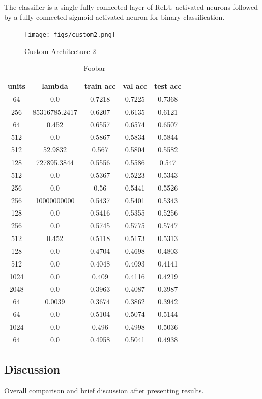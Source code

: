 The classifier is a single fully-connected layer of ReLU-activated neurons followed by a fully-connected sigmoid-activated neuron for binary classification.

\begin{figure}[ht]
    \centering
    \texttt{[image: figs/custom2.png]}
    \caption{Custom Architecture 2}
    \label{fig:custom2}
\end{figure}


\begin{table}[ht]
\centering \begin{tabular}{ |c|c|c|c|c| }
\hline
units & lambda & train acc & val acc & test acc \\
\hline
64 & 0.0 & 0.7218 & 0.7225 & 0.7368 \\
256 & 85316785.2417 & 0.6207 & 0.6135 & 0.6121 \\
64 & 0.452 & 0.6557 & 0.6574 & 0.6507 \\
512 & 0.0 & 0.5867 & 0.5834 & 0.5844 \\
512 & 52.9832 & 0.567 & 0.5804 & 0.5582 \\
128 & 727895.3844 & 0.5556 & 0.5586 & 0.547 \\
512 & 0.0 & 0.5367 & 0.5223 & 0.5343 \\
256 & 0.0 & 0.56 & 0.5441 & 0.5526 \\
256 & 10000000000 & 0.5437 & 0.5401 & 0.5343 \\
128 & 0.0 & 0.5416 & 0.5355 & 0.5256 \\
256 & 0.0 & 0.5745 & 0.5775 & 0.5747 \\
512 & 0.452 & 0.5118 & 0.5173 & 0.5313 \\
128 & 0.0 & 0.4704 & 0.4698 & 0.4803 \\
512 & 0.0 & 0.4048 & 0.4093 & 0.4141 \\
1024 & 0.0 & 0.409 & 0.4116 & 0.4219 \\
2048 & 0.0 & 0.3963 & 0.4087 & 0.3987 \\
64 & 0.0039 & 0.3674 & 0.3862 & 0.3942 \\
64 & 0.0 & 0.5104 & 0.5074 & 0.5144 \\
1024 & 0.0 & 0.496 & 0.4998 & 0.5036 \\
64 & 0.0 & 0.4958 & 0.5041 & 0.4938 \\
\hline
\end{tabular}
\caption{Foobar}
\label{table:foobar}
\end{table}

\subsection{Discussion}

Overall comparison and brief discussion after presenting results.
